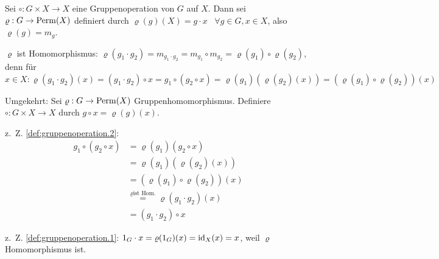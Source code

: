 \begin{beweis}
    \item Sei $\circ: G \times X \rightarrow X$ eine Gruppenoperation von $G$
          auf $X$. Dann sei $\varrho: G \rightarrow \operatorname{Perm}(X)$ definiert
          durch $\varrho(g)(X) = g \cdot x \;\;\; \forall g \in G, x \in X$,
          also $\varrho(g) = m_g$.

          $\varrho$ ist Homomorphismus: $\varrho(g_1 \cdot g_2) = m_{g_1 \cdot g_2} = m_{g_1} \circ m_{g_2} = \varrho(g_1) \circ \varrho(g_2)$,
          denn für $x \in X: \varrho(g_1 \cdot g_2) (x) = (g_1 \cdot g_2) \circ x = g_1 \circ (g_2 \circ x) = \varrho(g_1) (\varrho(g_2)(x)) = (\varrho(g_1) \circ \varrho (g_2)) (x)$

          Umgekehrt: Sei $\varrho: G \rightarrow \operatorname{Perm}(X)$ Gruppenhomomorphismus. Definiere $\circ: G \times X \rightarrow X$ durch $g \circ x = \varrho (g)(x)$.

          z.~Z. \ref{def:gruppenoperation.2}: 
          \begin{align*}
            g_1 \circ (g_2 \circ x) &= \varrho (g_1) (g_2 \circ x)\\
            &= \varrho(g_1) (\varrho(g_2)(x))\\
            &= (\varrho(g_1) \circ \varrho(g_2))(x)\\
            &\stackrel{\varrho \text {ist Hom.}}{=} \varrho(g_1 \cdot g_2) (x)\\
            &= (g_1 \cdot g_2) \circ x
          \end{align*}

            z.~Z. \ref{def:gruppenoperation.1}: 
            $1_G \cdot x = \varrho(1_G)(x) = \textnormal{id}_X(x) = x$, weil $\varrho$ Homomorphismus ist.
\end{beweis}

